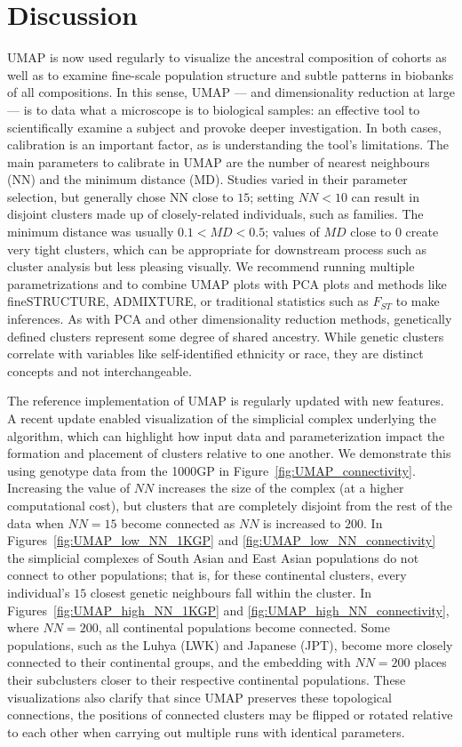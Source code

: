 \section{Discussion}
UMAP is now used regularly to visualize the ancestral composition of cohorts as well as to examine fine-scale population structure and subtle patterns in biobanks of all compositions. In this sense, UMAP --- and dimensionality reduction at large --- is to data what a microscope is to biological samples: an effective tool to scientifically examine a subject and provoke deeper investigation. In both cases, calibration is an important factor, as is understanding the tool's limitations. The main parameters to calibrate in UMAP are the number of nearest neighbours (NN) and the minimum distance (MD). Studies varied in their parameter selection, but generally chose NN close to $15$; setting $NN < 10$ can result in disjoint clusters made up of closely-related individuals, such as families. The minimum distance was usually $0.1 < MD < 0.5$; values of $MD$ close to $0$ create very tight clusters, which can be appropriate for  downstream process such as cluster analysis but less pleasing visually. We recommend running multiple parametrizations and to combine UMAP plots with PCA plots and methods like fineSTRUCTURE\citep{lawson2012inference}, ADMIXTURE\citep{alexander2009fast}, or traditional statistics such as $F_{ST}$ to make inferences. As with PCA and other dimensionality reduction methods, genetically defined clusters represent some degree of shared ancestry. While genetic clusters correlate with variables like self-identified ethnicity or race, they are distinct concepts and not interchangeable\citep{mathieson_what_2020}.

The reference implementation of UMAP is regularly updated with new features\citep{mcinnes2018software}. A recent update enabled visualization of the simplicial complex underlying the algorithm, which can highlight how input data and parameterization impact the formation and placement of clusters relative to one another. We demonstrate this using genotype data from the 1000GP in Figure~\ref{fig:UMAP_connectivity}. Increasing the value of $NN$ increases the size of the complex (at a higher computational cost), but clusters that are completely disjoint from the rest of the data when $NN=15$ become connected as $NN$ is increased to $200$. In Figures~\ref{fig:UMAP_low_NN_1KGP} and \ref{fig:UMAP_low_NN_connectivity} the simplicial complexes of South Asian and East Asian populations do not connect to other populations; that is, for these continental clusters, every individual's $15$ closest genetic neighbours fall within the cluster. In Figures~\ref{fig:UMAP_high_NN_1KGP} and \ref{fig:UMAP_high_NN_connectivity}, where $NN=200$, all continental populations become connected. Some populations, such as the Luhya (LWK) and Japanese (JPT), become more closely connected to their continental groups, and the embedding with $NN=200$ places their subclusters closer to their respective continental populations. These visualizations also clarify that since UMAP preserves these topological connections, the positions of connected clusters may be flipped or rotated relative to each other when carrying out multiple runs with identical parameters.

